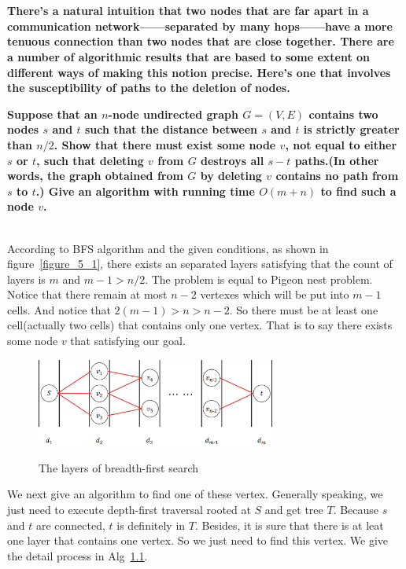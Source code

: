 
\chapter{}
\textbf{
There's a natural intuition that two nodes that are far apart in a communication network——separated by many hops——have a more tenuous connection than two nodes that are close together. There are a number of algorithmic results that are based to some extent on different ways of making this notion precise. Here's one that involves the susceptibility of paths to the deletion of nodes.
}

\textbf{
Suppose that an $n$-node undirected graph $G=(V,E)$ contains two nodes $s$ and $t$ such that the distance between $s$ and $t$ is strictly greater than $n/2$. Show that there must exist some node $v$, not equal to either $s$ or $t$, such that deleting $v$ from $G$ destroys all $s-t$ paths.(In other words, the graph obtained from $G$ by deleting $v$ contains no path from $s$ to $t$.) Give an algorithm with running time $O(m+n)$ to find such a node $v$.
}

\hspace*{\fill} \\

According to BFS algorithm and the given conditions, as shown in figure~\ref{figure_5_1}, there exists an separated layers satisfying that the count of layers is $m$ and $m-1> n/2 $. The problem is equal to Pigeon nest problem. Notice that there remain at most $n-2$ vertexes which will be put into $m-1$ cells. And notice that $2(m-1)>n>n-2$. So there must be at least one cell(actually two cells) that contains only one vertex. That is to say there exists some node $v$ that satisfying our goal.
\begin{figure}[!htbp]
  \centering
  \includegraphics[width=0.7\textwidth]{figures/5_1.eps}\\
  \caption{The layers of breadth-first search}\label{find_key_point}
\end{figure}

We next give an algorithm to find one of these vertex. Generally speaking, we just need to execute depth-first traversal rooted at $S$ and get tree $T$. Because $s$ and $t$ are connected, $t$ is definitely in $T$. Besides, it is sure that there is at leat one layer that contains one vertex. So we just need to find this vertex. We give the detail process in Alg~\ref{find_key_point}.

